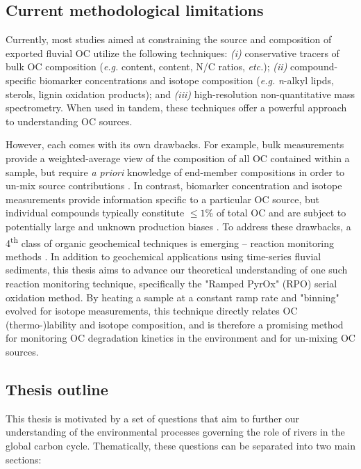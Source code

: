 \subsection{Current methodological limitations}

Currently, most studies aimed at constraining the source and composition of exported fluvial OC utilize the following techniques: \textit{(i)} conservative tracers of bulk OC composition (\textit{e.g.}  content,  content, N/C ratios, \textit{etc.}); \textit{(ii)} compound-specific biomarker concentrations and isotope composition (\textit{e.g.} \textit{n}-alkyl lipds, sterols, lignin oxidation products); and \textit{(iii)} high-resolution non-quantitative mass spectrometry. When used in tandem, these techniques offer a powerful approach to understanding OC sources. 

However, each comes with its own drawbacks. For example, bulk measurements provide a weighted-average view of the composition of all OC contained within a sample, but require \textit{a priori} knowledge of end-member compositions in order to un-mix source contributions \citep{Perdue:2007fn,Weijers:2009iu,Hilton:2010cg,Hossler:2012jh}. In contrast, biomarker concentration and isotope measurements provide information specific to a particular OC source, but individual compounds typically constitute $\leq 1$\% of total OC and are subject to potentially large and unknown production biases \citep{Garcin:2014hg,Ponton:2014jr}. To address these drawbacks, a 4\textsuperscript{th} class of organic geochemical techniques is emerging -- reaction monitoring methods \citep[\textit{e.g.}][]{Rosenheim:2008ed,Follett:2014if,Beaupre:2016km}. In addition to geochemical applications using time-series fluvial sediments, this thesis aims to advance our theoretical understanding of one such reaction monitoring technique, specifically the "Ramped PyrOx" (RPO) serial oxidation method. By heating a sample at a constant ramp rate and "binning" evolved  for isotope measurements, this technique directly relates OC (thermo-)lability and isotope composition, and is therefore a promising method for monitoring OC degradation kinetics in the environment and for un-mixing OC sources.

\subsection{Thesis outline}

This thesis is motivated by a set of questions that aim to further our understanding of the environmental processes governing the role of rivers in the global carbon cycle. Thematically, these questions can be separated into two main sections:

